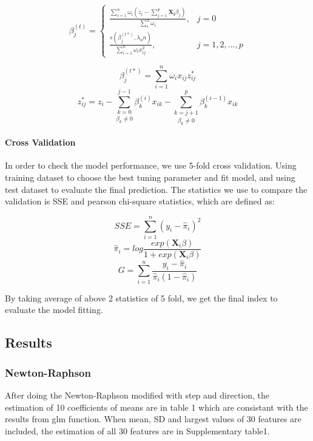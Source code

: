 \documentclass[]{article}
\let\oldparagraph\paragraph
\renewcommand{\paragraph}[1]{\oldparagraph{#1}\mbox{}}
\begin{document}
\[\beta_j^{(t)} = \left\{\begin{array}{lc} \frac{\sum_{i=1}^{n} \omega_i(z_i-\sum_{j=1}^{p}{\boldsymbol {X_i}\beta_j})}{\sum_{i}^{n}\omega_i},&j=0\\\frac{s(\beta_j^{(t*)},\lambda_un)}{\sum_{i=1}^{n}\omega_ix_{ij}^2},&j = 1,2,...,p\end{array}\right.\]

\[\beta_j^{(t*)} = \sum_{i=1}^{n}\omega_ix_{ij}z_{ij}^*\]
\[z_{ij}^* = z_i-\underset {\beta_k\neq0}{\sum_{k = 0}^{j-1}}\beta_k^{(i)}x_{ik}-\underset {\beta_k\neq0}{\sum_{k=j+1}^{p}}\beta_k^{(i-1)}x_{ik}\]

\hypertarget{cross-validation}{%
\paragraph{Cross Validation}\label{cross-validation}}

In order to check the model performance, we use 5-fold cross validation.
Using training dataset to choose the best tuning parameter and fit
model, and using test dataset to evaluate the final prediction. The
statistics we use to compare the validation is SSE and pearson
chi-square statistics, which are defined as:

\[SSE = \sum_{i=1}^{n}(y_i-{\widehat \pi_i})^2\]
\[{\widehat \pi_i} = log\frac{exp({\boldsymbol X_i\beta})}{1+exp({\boldsymbol X_i\beta})}\]
\[G = \sum_{i=1}^{n}\frac{y_i-{\widehat \pi_i}}{{\widehat \pi_i}(1-{\widehat \pi_i})}\]

By taking average of above 2 statistics of 5 fold, we get the final
index to evaluate the model fitting.

\hypertarget{results}{%
\subsection{Results}\label{results}}

\hypertarget{newton-raphson}{%
\subsubsection{Newton-Raphson}\label{newton-raphson}}

After doing the Newton-Raphson modified with step and direction, the
estimation of 10 coefficients of means are in table 1 which are
consistant with the results from glm function. When mean, SD and largest
values of 30 features are included, the estimation of all 30 features
are in Supplementary table1.
\end{document}
